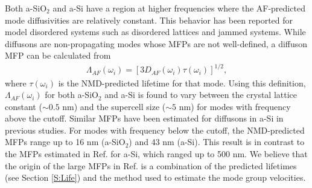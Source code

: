 \documentclass[aps,prb,onecolumn,preprint,superscriptaddress,footinbib,amsmath,amssymb,floatfix]{revtex4}
\begin{document}
Both a-SiO$_2$ and a-Si have a region at higher frequencies where 
the AF-predicted mode diffusivities are relatively constant. This 
behavior has been reported for model disordered systems such as 
disordered lattices\cite{sheng_heat_1991,beltukov_ioffe-regel_2013,
larkin_predicting_2013} and jammed systems.
\cite{xu_energy_2009,vitelli_heat_2010}  
While diffusons are non-propagating modes whose MFPs are not 
well-defined,\cite{feldman_thermal_1993} 
a diffuson MFP can be calculated from 
\begin{equation}\label{EQ:LambdaAF}
\begin{split}
\Lambda_{AF}(\omega_i) = [3D_{AF}(\omega_i)\tau(\omega_i)]^{1/2},
\end{split}
\end{equation}
where $\tau(\omega_{i})$ is the NMD-predicted lifetime for that mode. 
Using this definition, $\Lambda_{AF}(\omega_i)$ for both a-SiO$_2$ 
and a-Si is found to vary between the crystal lattice constant 
($\sim 0.5$ nm) and 
the supercell size ($\sim 5$ nm) 
for modes with frequency above the cutoff. 
Similar MFPs have been estimated for diffusons in a-Si in 
previous studies.\cite{feldman_thermal_1993,feldman_numerical_1999} 
For modes with frequency below the cutoff, the NMD-predicted 
MFPs range up to 16 nm (a-SiO$_2$) 
and 43 nm (a-Si). This result is in contrast to the MFPs 
estimated in Ref.  for a-Si, which ranged 
up to 500 nm. We believe that the origin of the large MFPs 
in Ref.  is 
a combination of the predicted lifetimes (see Section \ref{S:Life}) 
and the method used to estimate the mode group velocities.
\end{document}
